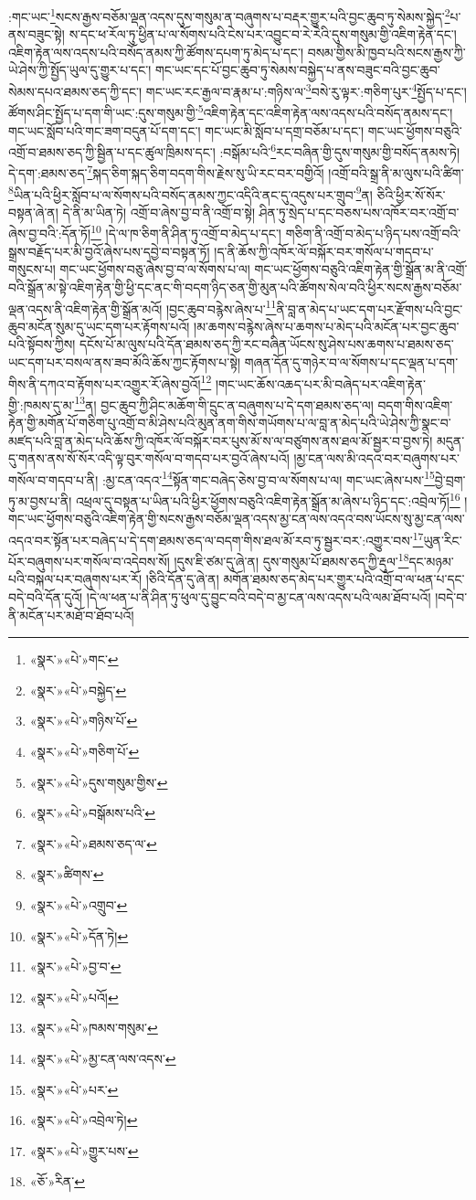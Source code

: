 :གང་ཡང་\footnote{«སྣར་»«པེ་»གང་}སངས་རྒྱས་བཅོམ་ལྡན་འདས་དུས་གསུམ་ན་བཞུགས་པ་བརྡར་གྱུར་པའི་བྱང་ཆུབ་ཏུ་སེམས་སྐྱེད་\footnote{«སྣར་»«པེ་»བསྐྱེད་}པ་ནས་བཟུང་སྟེ། ས་དང་ཕ་རོལ་ཏུ་ཕྱིན་པ་ལ་སོགས་པའི་ངེས་པར་འབྱུང་བ་རེ་རེའི་དུས་གསུམ་གྱི་འཇིག་རྟེན་དང་། འཇིག་རྟེན་ལས་འདས་པའི་བསོད་ནམས་ཀྱི་ཚོགས་དཔག་ཏུ་མེད་པ་དང་། བསམ་གྱིས་མི་ཁྱབ་པའི་སངས་རྒྱས་ཀྱི་ཡེ་ཤེས་ཀྱི་སྤྱོད་ཡུལ་དུ་གྱུར་པ་དང་། གང་ཡང་དང་པོ་བྱང་ཆུབ་ཏུ་སེམས་བསྐྱེད་པ་ནས་བཟུང་བའི་བྱང་ཆུབ་སེམས་དཔའ་ཐམས་ཅད་ཀྱི་དང་། གང་ཡང་རང་རྒྱལ་བ་རྣམ་པ་:གཉིས་ལ་\footnote{«སྣར་»«པེ་»གཉིས་པོ་}བསེ་རུ་ལྟར་:གཅིག་པུར་\footnote{«སྣར་»«པེ་»གཅིག་པོ་}སྤྱོད་པ་དང་། ཚོགས་ཤིང་སྤྱོད་པ་དག་གི་ཡང་:དུས་གསུམ་གྱི་\footnote{«སྣར་»«པེ་»དུས་གསུམ་གྱིས་}འཇིག་རྟེན་དང་འཇིག་རྟེན་ལས་འདས་པའི་བསོད་ནམས་དང་། གང་ཡང་སློབ་པའི་གང་ཟག་བདུན་པོ་དག་དང་། གང་ཡང་མི་སློབ་པ་དགྲ་བཅོམ་པ་དང་། གང་ཡང་ཕྱོགས་བཅུའི་འགྲོ་བ་ཐམས་ཅད་ཀྱི་སྦྱིན་པ་དང་ཚུལ་ཁྲིམས་དང་། :བསྒོམ་པའི་\footnote{«སྣར་»«པེ་»བསྒོམས་པའི་}རང་བཞིན་གྱི་དུས་གསུམ་གྱི་བསོད་ནམས་ཏེ། དེ་དག་:ཐམས་ཅད་\footnote{«སྣར་»«པེ་»ཐམས་ཅད་ལ་}སྐད་ཅིག་སྐད་ཅིག་བདག་གིས་རྗེས་སུ་ཡི་རང་བར་བགྱིའོ། །འགྲོ་བའི་སྒྲ་ནི་མ་ལུས་པའི་ཚིག་\footnote{«སྣར་»ཚིགས་}ཡིན་པའི་ཕྱིར་སློབ་པ་ལ་སོགས་པའི་བསོད་ནམས་ཀྱང་འདིའི་ནང་དུ་འདུས་པར་གྲུབ་\footnote{«སྣར་»«པེ་»འགྲུབ་}ན། ཅིའི་ཕྱིར་སོ་སོར་བསྟན་ཞེ་ན། དེ་ནི་མ་ཡིན་ཏེ། འགྲོ་བ་ཞེས་བྱ་བ་ནི་འགྲོ་བ་སྟེ། ཤིན་ཏུ་སྲེད་པ་དང་བཅས་པས་འཁོར་བར་འགྲོ་བ་ཞེས་བྱ་བའི་:དོན་ཏོ།\footnote{«སྣར་»«པེ་»དོན་ཏེ།} །དེ་ལ་ཁ་ཅིག་ནི་ཤིན་ཏུ་འགྲོ་བ་མེད་པ་དང་། གཅིག་ནི་འགྲོ་བ་མེད་པ་ཉིད་པས་འགྲོ་བའི་སྒྲས་བརྗོད་པར་མི་བྱའོ་ཞེས་པས་དབྱེ་བ་བསྟན་ཏོ། །ད་ནི་ཆོས་ཀྱི་འཁོར་ལོ་བསྐོར་བར་གསོལ་པ་གདབ་པ་གསུངས་པ། གང་ཡང་ཕྱོགས་བཅུ་ཞེས་བྱ་བ་ལ་སོགས་པ་ལ། གང་ཡང་ཕྱོགས་བཅུའི་འཇིག་རྟེན་གྱི་སྒྲོན་མ་ནི་འགྲོ་བའི་སྒྲོན་མ་སྟེ་འཇིག་རྟེན་གྱི་ཕྱི་དང་ནང་གི་བདག་ཉིད་ཅན་གྱི་མུན་པའི་ཚོགས་སེལ་བའི་ཕྱིར་སངས་རྒྱས་བཅོམ་ལྡན་འདས་ནི་འཇིག་རྟེན་གྱི་སྒྲོན་མའོ། །བྱང་ཆུབ་བརྙེས་ཞེས་པ་\footnote{«སྣར་»«པེ་»བྱ་བ་}ནི་བླ་ན་མེད་པ་ཡང་དག་པར་རྫོགས་པའི་བྱང་ཆུབ་མངོན་སུམ་དུ་ཡང་དག་པར་རྟོགས་པའོ། །མ་ཆགས་བརྙེས་ཞེས་པ་ཆགས་པ་མེད་པའི་མངོན་པར་བྱང་ཆུབ་པའི་སྟོབས་ཀྱིས། དངོས་པོ་མ་ལུས་པའི་དོན་ཐམས་ཅད་ཀྱི་རང་བཞིན་ཡོངས་སུ་ཤེས་པས་ཆགས་པ་ཐམས་ཅད་ཡང་དག་པར་བསལ་ནས་ཟབ་མོའི་ཆོས་ཀྱང་རྟོགས་པ་སྟེ། གཞན་དོན་དུ་གཉེར་བ་ལ་སོགས་པ་དང་ལྡན་པ་དག་གིས་ནི་དཀའ་བ་རྟོགས་པར་འགྱུར་རོ་ཞེས་བྱའོ།\footnote{«སྣར་»«པེ་»པའོ།} །གང་ཡང་ཆོས་འཆད་པར་མི་བཞེད་པར་འཇིག་རྟེན་གྱི་:ཁམས་དུ་མ་\footnote{«སྣར་»«པེ་»ཁམས་གསུམ་}ན། བྱང་ཆུབ་ཀྱི་ཤིང་མཆོག་གི་དྲུང་ན་བཞུགས་པ་དེ་དག་ཐམས་ཅད་ལ། བདག་གིས་འཇིག་རྟེན་གྱི་མགོན་པོ་གཅིག་པུ་འགྲོ་བ་མི་ཤེས་པའི་མུན་ནག་གིས་གཡོགས་པ་ལ་བླ་ན་མེད་པའི་ཡེ་ཤེས་ཀྱི་སྣང་བ་མཛད་པའི་བླ་ན་མེད་པའི་ཆོས་ཀྱི་འཁོར་ལོ་བསྐོར་བར་པུས་མོ་ས་ལ་བཙུགས་ནས་ཐལ་མོ་སྦྱར་བ་བྱས་ཏེ། མདུན་དུ་གནས་ནས་སོ་སོར་འདི་ལྟ་བུར་གསོལ་བ་གདབ་པར་བྱའོ་ཞེས་པའོ། །མྱ་ངན་ལས་མི་འདའ་བར་བཞུགས་པར་གསོལ་བ་གདབ་པ་ནི། :མྱ་ངན་འདའ་\footnote{«སྣར་»«པེ་»མྱ་ངན་ལས་འདས་}སྟོན་གང་བཞེད་ཅེས་བྱ་བ་ལ་སོགས་པ་ལ། གང་ཡང་ཞེས་པས་\footnote{«སྣར་»«པེ་»པར་}བྱེ་བྲག་ཏུ་མ་བྱས་པ་ནི། འཕྲལ་དུ་བསྟན་པ་ཡིན་པའི་ཕྱིར་ཕྱོགས་བཅུའི་འཇིག་རྟེན་སྒྲོན་མ་ཞེས་པ་ཉིད་དང་:འབྲེལ་ཏོ།\footnote{«སྣར་»«པེ་»འབྲེལ་ཏེ།} །གང་ཡང་ཕྱོགས་བཅུའི་འཇིག་རྟེན་གྱི་སངས་རྒྱས་བཅོམ་ལྡན་འདས་མྱ་ངན་ལས་འདའ་བས་ཡོངས་སུ་མྱ་ངན་ལས་འདའ་བར་སྟོན་པར་བཞེད་པ་དེ་དག་ཐམས་ཅད་ལ་བདག་གིས་ཐལ་མོ་རབ་ཏུ་སྦྱར་བར་:འགྱུར་བས་\footnote{«སྣར་»«པེ་»གྱུར་པས་}ཡུན་རིང་པོར་བཞུགས་པར་གསོལ་བ་འདེབས་སོ། །དུས་ཇི་ཙམ་དུ་ཞེ་ན། དུས་གསུམ་པོ་ཐམས་ཅད་ཀྱི་རྡུལ་\footnote{«ཅོ་»རིན་}དང་མཉམ་པའི་བསྐལ་པར་བཞུགས་པར་རོ། །ཅིའི་དོན་དུ་ཞེ་ན། མགོན་ཐམས་ཅད་མེད་པར་གྱུར་པའི་འགྲོ་བ་ལ་ཕན་པ་དང་བདེ་བའི་དོན་དུའོ། །དེ་ལ་ཕན་པ་ནི་ཤིན་ཏུ་ཕུལ་དུ་བྱུང་བའི་བདེ་བ་མྱ་ངན་ལས་འདས་པའི་ལམ་ཐོབ་པའོ། །བདེ་བ་ནི་མངོན་པར་མཐོ་བ་ཐོབ་པའོ། 